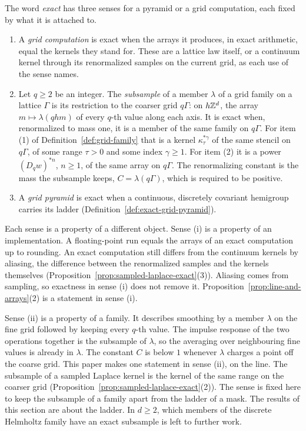 \begin{definition}
\label{def:exact-senses}

The word \emph{exact} has three senses for a pyramid or a grid computation, each fixed by what it
is attached to.
\begin{enumerate}
\item A \emph{grid computation} is exact when the arrays it produces, in exact arithmetic, equal
the kernels they stand for. These are a lattice law itself, or a continuum kernel through its renormalized samples on the current grid, as each use of the sense names.
\item Let $q \ge 2$ be an integer. The \emph{subsample} of a member $\lambda$ of a grid family on
a lattice $\Gamma$ is its restriction to the coarser grid $q\Gamma$: on $h\mathbb{Z}^d$, the array
$m \mapsto \lambda(qhm)$ of every $q$-th value along each axis. It is exact when, renormalized to
mass one, it is a member of the same family on $q\Gamma$. For item (1) of
Definition~\ref{def:grid-family} that is a kernel $\kappa_\tau^{*\gamma}$ of the same stencil on
$q\Gamma$, of some range $\tau > 0$ and some index $\gamma \ge 1$. For item (2) it is a power
$(D_qw)^{*n}$, $n \ge 1$, of the same array on $q\Gamma$. The renormalizing constant is the mass
the subsample keeps, $C = \lambda(q\Gamma)$, which is required to be positive.
\item A \emph{grid pyramid} is exact when a continuous, discretely covariant hemigroup carries its
ladder (Definition~\ref{def:exact-grid-pyramid}).
\end{enumerate}
\end{definition}

Each sense is a property of a different object. Sense (i) is a property of an implementation. A
floating-point run equals the arrays of an exact computation up to rounding. An exact computation
still differs from the continuum kernels by aliasing, the difference between the renormalized
samples and the kernels themselves (Proposition~\ref{prop:sampled-laplace-exact}(3)). Aliasing
comes from sampling, so exactness in sense (i) does not remove it.
Proposition~\ref{prop:line-and-arrays}(2) is a statement in sense (i).

Sense (ii) is a property of a family. It describes smoothing by a member $\lambda$ on the fine grid
followed by keeping every $q$-th value. The impulse response of the two operations together is the
subsample of $\lambda$, so the averaging over neighbouring fine values is already in $\lambda$. The
constant $C$ is below $1$ whenever $\lambda$ charges a point off the coarse grid. This paper makes
one statement in sense (ii), on the line. The subsample of a sampled Laplace kernel is the kernel
of the same range on the coarser grid (Proposition~\ref{prop:sampled-laplace-exact}(2)). The sense
is fixed here to keep the subsample of a family apart from the ladder of a mask. The results of
this section are about the ladder. In $d \ge 2$, which members of the discrete Helmholtz family
have an exact subsample is left to further work.

